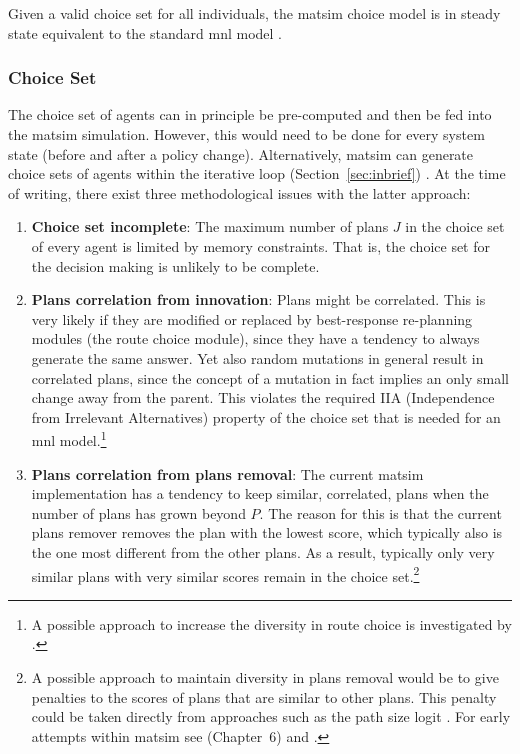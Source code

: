 Given a valid choice set for all individuals, the \acrshort{matsim} choice model is in steady state equivalent to the standard \gls{mnl} model \citep{NagelFloetteroed2009IatbrResourceInBook}.

\subsubsection{Choice Set}
\label{sec:choice-set}


The choice set of agents can in principle be pre-computed and then be fed into the \acrshort{matsim} simulation. However, this would need to be done for every system state (\eg before and after a policy change).
%
Alternatively, \acrshort{matsim} can generate choice sets of agents within the iterative loop (Section~\ref{sec:inbrief})
%
%
. At the time of writing, there exist three methodological issues with the latter approach:
%
\begin{enumerate}\styleEnumerate
\item \textbf{Choice set incomplete}: The maximum number of plans $J$ in the choice set of every agent is limited by memory constraints. That is, the choice set for the decision making is unlikely to be complete.
%
\item \textbf{Plans correlation from innovation}: Plans might be correlated. This is very likely if they are modified or replaced by best-response re-planning modules (\eg the route choice module), since they have a tendency to always generate the same answer. Yet also random mutations in general result in correlated plans, since the concept of a mutation in fact implies an only small change away from the parent.  This violates the required IIA (Independence from Irrelevant Alternatives) 
property of the choice set that is needed for an \gls{mnl} 
model.\footnote{%
%
A possible approach to increase the diversity in route choice is investigated by \citet{NagelKickhoeferJoubert2014HeterogeneousVoTsPROCEDIA}.
%
}

\item \textbf{Plans correlation from plans removal}: The current \acrshort{matsim} implementation has a tendency to keep similar, \ie  correlated, plans when the number of plans has grown beyond $P$.  The reason for this is that the current plans remover removes the plan with the lowest score, which typically also is the one most different from the other plans.  As a result, typically only very similar plans with very similar scores remain in the choice set.\footnote{%
%
A possible approach to maintain diversity in plans removal would be to give penalties to the scores of plans that are similar to other plans.  This penalty could be taken directly from approaches such as the path size logit \citep{DaganzoSheffi_TransScience_1977,FrejingerBierlaire_TransResB_2007}.  For early attempts within \acrshort{matsim} see \citet{Grether_PhDThesis_2014} (Chapter~6) and \cite{NeumannEtAlPassengerArrivalPatterns}.
%
}
%
\end{enumerate}
